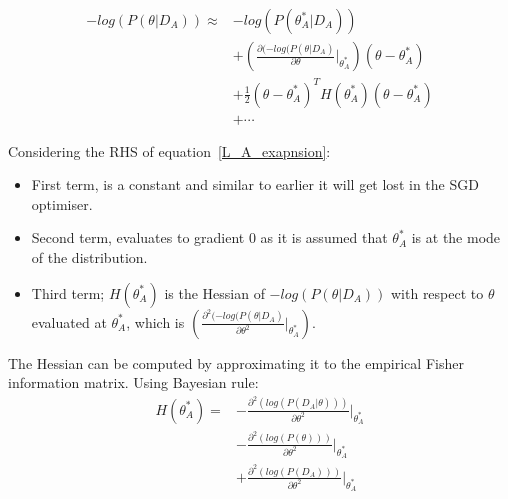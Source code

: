 \begin{equation} \label{L_A_exapnsion}
\begin{split}
    -log(P(\theta|D_A)) \approx & -log(P(\theta^*_A|D_A)) 
    \\
    & + (\frac{\partial(-log(P(\theta|D_A)}{\partial \theta}\vert_{\theta^*_A})(\theta - \theta^*_A) 
    \\
    & + \frac{1}{2}(\theta - \theta^*_A)^{T} H(\theta^*_A)(\theta - \theta^*_A) 
    \\
    & + \cdots
\end{split}
\end{equation}

\noindent Considering the RHS of equation~\ref{L_A_exapnsion}:
\begin{itemize}
    \item First term, is a constant and similar to earlier it will get lost in the SGD optimiser.  
%
    \item Second term, evaluates to gradient 0 as it is assumed that $\theta^*_A$ is at the mode of the distribution. 
%
    \item  Third term; $H(\theta^{*}_{A})$ is the Hessian of $-log(P(\theta|D_A))$ with respect to $\theta$ evaluated at $\theta^*_A$, which is $(\frac{\partial^2(-log(P(\theta|D_A)}{\partial \theta^2}\vert_{\theta^*_A})$.  
\end{itemize}

The Hessian can be computed by approximating it to the empirical Fisher information matrix.
%
Using Bayesian rule: 
\begin{equation} \label{Bayesian_Approximation_To_Gaussian}
\begin{split}
    H(\theta^*_A) = &-\frac{\partial^2(log(P(D_A|\theta)))}{\partial\theta^2}\Bigg|_{\theta^*_A}
    \\
    & - \frac{\partial^2(log(P(\theta)))}{\partial\theta^2}\Bigg|_{\theta^*_A} 
    \\
    & + \frac{\partial^2(log(P(D_A)))}{\partial\theta^2}\Bigg|_{\theta^*_A}
\end{split}
\end{equation}

